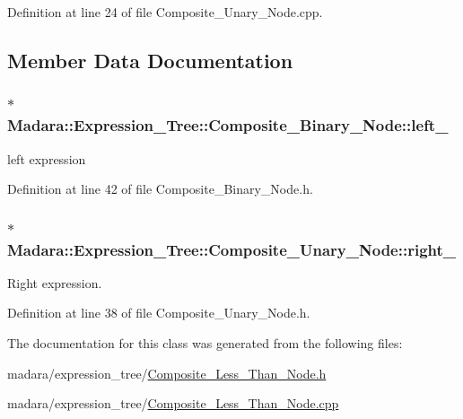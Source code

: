 Definition at line 24 of file Composite\_\-Unary\_\-Node.cpp.



\subsection{Member Data Documentation}
\hypertarget{classMadara_1_1Expression__Tree_1_1Composite__Binary__Node_acac60a70beb2484737e6e7161edb2d1b}{
\subsubsection[{left\_\-}]{$\ast$ {\bf Madara::Expression\_\-Tree::Composite\_\-Binary\_\-Node::left\_\-}}}
\label{df/d55/classMadara_1_1Expression__Tree_1_1Composite__Binary__Node_acac60a70beb2484737e6e7161edb2d1b}


left expression 



Definition at line 42 of file Composite\_\-Binary\_\-Node.h.

\hypertarget{classMadara_1_1Expression__Tree_1_1Composite__Unary__Node_a077b7bd1b52df6f5c6adfde735556a68}{
\subsubsection[{right\_\-}]{$\ast$ {\bf Madara::Expression\_\-Tree::Composite\_\-Unary\_\-Node::right\_\-}}}
\label{d3/dc7/classMadara_1_1Expression__Tree_1_1Composite__Unary__Node_a077b7bd1b52df6f5c6adfde735556a68}


Right expression. 



Definition at line 38 of file Composite\_\-Unary\_\-Node.h.



The documentation for this class was generated from the following files:\begin{DoxyCompactItemize}
\item 
madara/expression\_\-tree/\hyperlink{Composite__Less__Than__Node_8h}{Composite\_\-Less\_\-Than\_\-Node.h}\item 
madara/expression\_\-tree/\hyperlink{Composite__Less__Than__Node_8cpp}{Composite\_\-Less\_\-Than\_\-Node.cpp}\end{DoxyCompactItemize}
